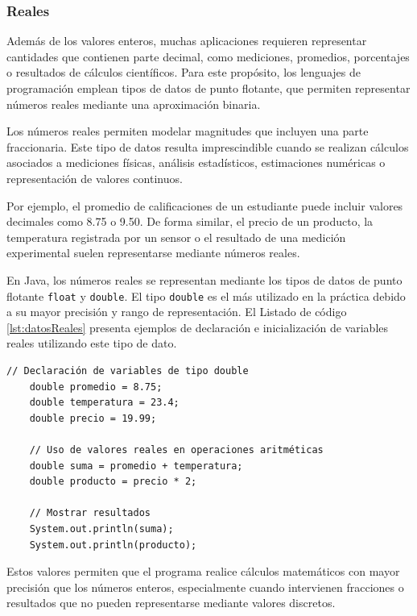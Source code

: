 \documentclass[12pt,twoside]{book}
\begin{document}
					\subsubsection{Reales}
						\noindent
						Además de los valores enteros, muchas aplicaciones requieren representar cantidades que contienen parte decimal, como mediciones, promedios, porcentajes o resultados de cálculos científicos. Para este propósito, los lenguajes de programación emplean tipos de datos de punto flotante, que permiten representar números reales mediante una aproximación binaria.
						
						Los números reales permiten modelar magnitudes que incluyen una parte fraccionaria. Este tipo de datos resulta imprescindible cuando se realizan cálculos asociados a mediciones físicas, análisis estadísticos, estimaciones numéricas o representación de valores continuos.
						
						Por ejemplo, el promedio de calificaciones de un estudiante puede incluir valores decimales como 8.75 o 9.50. De forma similar, el precio de un producto, la temperatura registrada por un sensor o el resultado de una medición experimental suelen representarse mediante números reales.
						
						En Java, los números reales se representan mediante los tipos de datos de punto flotante \texttt{float} y \texttt{double}. El tipo \texttt{double} es el más utilizado en la práctica debido a su mayor precisión y rango de representación. El Listado de código \ref{lst:datosReales} presenta ejemplos de declaración e inicialización de variables reales utilizando este tipo de dato.
						
						\begin{lstlisting}[style=Java,caption={Datos Reales de Mayor Precisión en Java.},label={lst:datosReales}]
	// Declaración de variables de tipo double
	double promedio = 8.75;
	double temperatura = 23.4;
	double precio = 19.99;
	
	// Uso de valores reales en operaciones aritméticas
	double suma = promedio + temperatura;
	double producto = precio * 2;
	
	// Mostrar resultados
	System.out.println(suma);
	System.out.println(producto);
						\end{lstlisting}
						
						\noindent
						Estos valores permiten que el programa realice cálculos matemáticos con mayor precisión que los números enteros, especialmente cuando intervienen fracciones o resultados que no pueden representarse mediante valores discretos.
						
\end{document}

